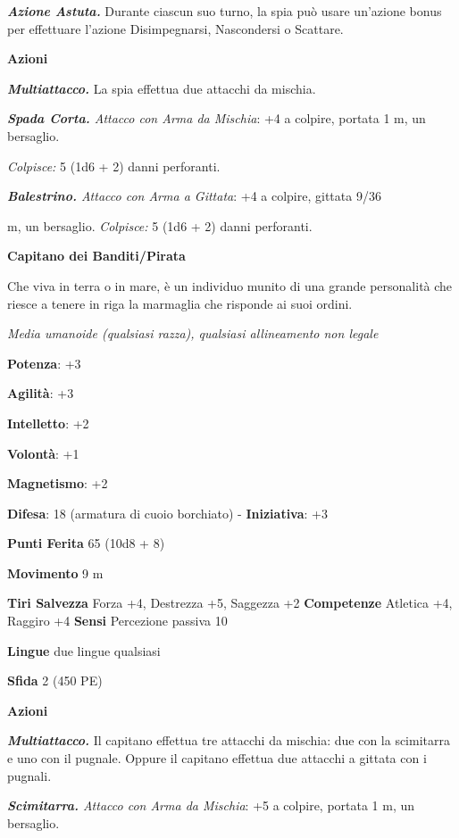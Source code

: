 \begin{multicols}{2}
\emph{\textbf{Azione Astuta.}} Durante ciascun suo turno, la spia può
usare un'azione bonus per effettuare l'azione Disimpegnarsi, Nascondersi
o Scattare.

\smallskip\textbf{Azioni}

\emph{\textbf{Multiattacco.}} La spia effettua due attacchi da mischia.

\emph{\textbf{Spada Corta.} Attacco con Arma da Mischia}: +4 a colpire,
portata 1 m, un bersaglio.

\emph{Colpisce:} 5 (1d6 + 2) danni perforanti.

\emph{\textbf{Balestrino.} Attacco con Arma a Gittata}: +4 a colpire,
gittata 9/36

m, un bersaglio. \emph{Colpisce:} 5 (1d6 + 2) danni perforanti.



\textbf{Capitano dei Banditi/Pirata}

Che viva in terra o in mare, è un individuo munito di una grande
personalità che riesce a tenere in riga la marmaglia che risponde ai
suoi ordini.

\emph{Media umanoide (qualsiasi razza), qualsiasi allineamento non
legale}

\textbf{Potenza}: +3

\textbf{Agilità}: +3

\textbf{Intelletto}: +2

\textbf{Volontà}: +1

\textbf{Magnetismo}: +2

\textbf{Difesa}: 18 (armatura di cuoio borchiato) - \textbf{Iniziativa}: +3

\textbf{Punti Ferita} 65 (10d8 + 8)

\textbf{Movimento} 9 m

\textbf{Tiri Salvezza} Forza +4, Destrezza +5, Saggezza +2
\textbf{Competenze} Atletica +4, Raggiro +4 \textbf{Sensi} Percezione
passiva 10

\textbf{Lingue} due lingue qualsiasi

\textbf{Sfida} 2 (450 PE)\smallskip

\smallskip\textbf{Azioni}

\emph{\textbf{Multiattacco.}} Il capitano effettua tre attacchi da
mischia: due con la scimitarra e uno con il pugnale. Oppure il capitano
effettua due attacchi a gittata con i pugnali.

\emph{\textbf{Scimitarra.} Attacco con Arma da Mischia}: +5 a colpire,
portata 1 m, un bersaglio.


\end{multicols}
